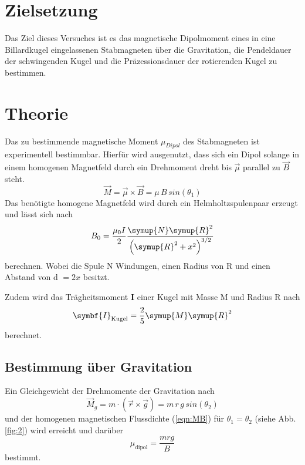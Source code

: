 \section{Zielsetzung}
\label{sec:Zielsetzung}

Das Ziel dieses Versuches ist es das magnetische Dipolmoment eines in eine
Billardkugel eingelassenen Stabmagneten über die Gravitation, die Pendeldauer
der schwingenden Kugel und die Präzessionsdauer der rotierenden Kugel zu bestimmen.


\section{Theorie}
\label{sec:Theorie}

Das zu bestimmende magnetische Moment $\mu_{Dipol}$ des Stabmagneten
ist experimentell bestimmbar. Hierfür wird ausgenutzt, dass
sich ein Dipol solange in einem homogenen Magnetfeld durch ein
Drehmoment dreht bis $\vec{\mu}$ parallel zu $\vec{B}$ steht.
\begin{equation}
  \vec{M} = \vec{\mu} \times \vec{B} = \mu \, B \, sin(\theta_{1})
  \label{eqn:MB}
\end{equation}
Das benötigte homogene Magnetfeld wird durch ein Helmholtzspulenpaar erzeugt
und lässt sich nach
\begin{equation}
  B_0 = \frac{\mu_0I}{2}\frac{\symup{N}\symup{R}^2}{\left(\symup{R}^2+x^2\right)^{3/2}}
  \label{eqn:b0}
\end{equation}
berechnen. Wobei die Spule N Windungen, einen Radius von R und einen Abstand von d $=2x$
besitzt.

Zudem wird das Trägheitsmoment $\symbf{I}$ einer Kugel mit Masse M und Radius R nach
\begin{equation}
  \symbf{I}_\text{Kugel}=\frac{2}{5}\symup{M}\symup{R}^2
  \label{eqn:Ik}
\end{equation}
berechnet.

\subsection{Bestimmung über Gravitation}
Ein Gleichgewicht der Drehmomente der Gravitation nach
\begin{equation}
  {\vec{M}}_{g}= m \cdot \left(\vec{r}\times\vec{g}\right) = m\, r \, g\, sin(\theta_{2})
\end{equation}
und der homogenen magnetischen Flussdichte (\ref{eqn:MB})
für $\theta_1 =\theta_2$ (siehe Abb.\ref{fig:2}) wird erreicht und darüber
\begin{equation}
  \mu_\text{dipol}=\frac{mrg}{B}
  \label{eqn:grav}
\end{equation}
bestimmt.
